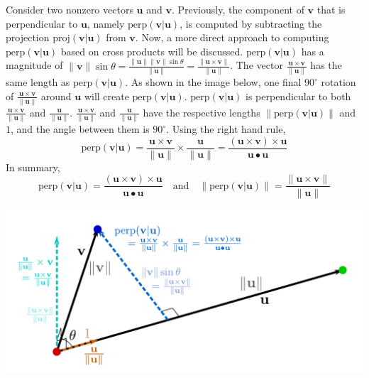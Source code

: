 \documentclass{article}
\begin{document}
Consider two nonzero vectors \(\mathbf{u}\) and \(\mathbf{v}\). Previously, the component of \(\mathbf{v}\) that is perpendicular to \(\mathbf{u}\), namely \(\text{perp}(\mathbf{v} | \mathbf{u})\), is computed by subtracting the projection \(\text{proj}(\mathbf{v} | \mathbf{u})\) from \(\mathbf{v}\). Now, a more direct approach to computing \(\text{perp}(\mathbf{v} | \mathbf{u})\) based on cross products will be discussed. \(\text{perp}(\mathbf{v} | \mathbf{u})\) has a magnitude of \(\|\mathbf{v}\| \sin\theta = \frac{\|\mathbf{u}\| \|\mathbf{v}\| \sin\theta}{\|\mathbf{u}\|} = \frac{\|\mathbf{u} \times \mathbf{v}\|}{\|\mathbf{u}\|}\). The vector \(\frac{\mathbf{u} \times \mathbf{v}}{\|\mathbf{u}\|}\) has the same length as \(\text{perp}(\mathbf{v} | \mathbf{u})\). As shown in the image below, one final \(90^\circ\) rotation of \(\frac{\mathbf{u} \times \mathbf{v}}{\|\mathbf{u}\|}\) around \(\mathbf{u}\) will create \(\text{perp}(\mathbf{v} | \mathbf{u})\). \(\text{perp}(\mathbf{v} | \mathbf{u})\) is perpendicular to both \(\frac{\mathbf{u} \times \mathbf{v}}{\|\mathbf{u}\|}\) and \(\frac{\mathbf{u}}{\|\mathbf{u}\|}\). \(\frac{\mathbf{u} \times \mathbf{v}}{\|\mathbf{u}\|}\) and \(\frac{\mathbf{u}}{\|\mathbf{u}\|}\) have the respective lengths \(\left\|\text{perp}(\mathbf{v} | \mathbf{u})\right\|\) and \(1\), and the angle between them is \(90^\circ\). Using the right hand rule, 
\[\text{perp}(\mathbf{v} | \mathbf{u}) = \frac{\mathbf{u} \times \mathbf{v}}{\|\mathbf{u}\|} \times \frac{\mathbf{u}}{\|\mathbf{u}\|} = \frac{(\mathbf{u} \times \mathbf{v}) \times \mathbf{u}}{\mathbf{u} \bullet \mathbf{u}}\]   
In summary, 
\[\text{perp}(\mathbf{v} | \mathbf{u}) = \frac{(\mathbf{u} \times \mathbf{v}) \times \mathbf{u}}{\mathbf{u} \bullet \mathbf{u}} \quad\text{and}\quad \left\|\text{perp}(\mathbf{v} | \mathbf{u})\right\| = \frac{\|\mathbf{u} \times \mathbf{v}\|}{\|\mathbf{u}\|}\]

\includegraphics[width = \textwidth]{perp_by_cross_product}
\end{document}
